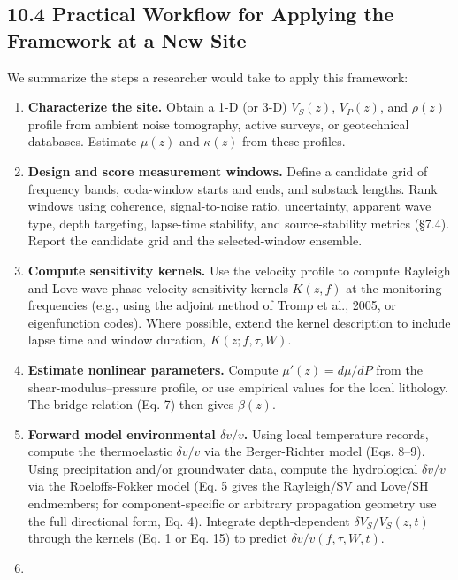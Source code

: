 \documentclass[12pt]{article}
\providecommand{\tightlist}{%
  \setlength{\itemsep}{0pt}\setlength{\parskip}{0pt}}
\begin{document}
\subsection{10.4 Practical Workflow for Applying the Framework at a New
Site}\label{practical-workflow-for-applying-the-framework-at-a-new-site}

We summarize the steps a researcher would take to apply this framework:

\begin{enumerate}
\def\labelenumi{\arabic{enumi}.}
\tightlist
\item
  \textbf{Characterize the site.} Obtain a 1-D (or 3-D) \(V_S(z)\),
  \(V_P(z)\), and \(\rho(z)\) profile from ambient noise tomography,
  active surveys, or geotechnical databases. Estimate \(\mu(z)\) and
  \(\kappa(z)\) from these profiles.
\item
  \textbf{Design and score measurement windows.} Define a candidate grid
  of frequency bands, coda-window starts and ends, and substack lengths.
  Rank windows using coherence, signal-to-noise ratio, uncertainty,
  apparent wave type, depth targeting, lapse-time stability, and
  source-stability metrics (§7.4). Report the candidate grid and the
  selected-window ensemble.
\item
  \textbf{Compute sensitivity kernels.} Use the velocity profile to
  compute Rayleigh and Love wave phase-velocity sensitivity kernels
  \(K(z,f)\) at the monitoring frequencies (e.g., using the adjoint
  method of Tromp et al., 2005, or eigenfunction codes). Where possible,
  extend the kernel description to include lapse time and window
  duration, \(K(z;f,\tau,W)\).
\item
  \textbf{Estimate nonlinear parameters.} Compute \(\mu'(z) = d\mu/dP\)
  from the shear-modulus--pressure profile, or use empirical values for
  the local lithology. The bridge relation (Eq. 7) then gives
  \(\beta(z)\).
\item
  \textbf{Forward model environmental \(\delta v/v\).} Using local
  temperature records, compute the thermoelastic \(\delta v/v\) via the
  Berger-Richter model (Eqs. 8--9). Using precipitation and/or
  groundwater data, compute the hydrological \(\delta v/v\) via the
  Roeloffs-Fokker model (Eq. 5 gives the Rayleigh/SV and Love/SH
  endmembers; for component-specific or arbitrary propagation geometry
  use the full directional form, Eq. 4). Integrate depth-dependent
  \(\delta V_S/V_S(z,t)\) through the kernels (Eq. 1 or Eq. 15) to
  predict \(\delta v/v(f,\tau,W,t)\).
\item

\end{enumerate}
\end{document}
